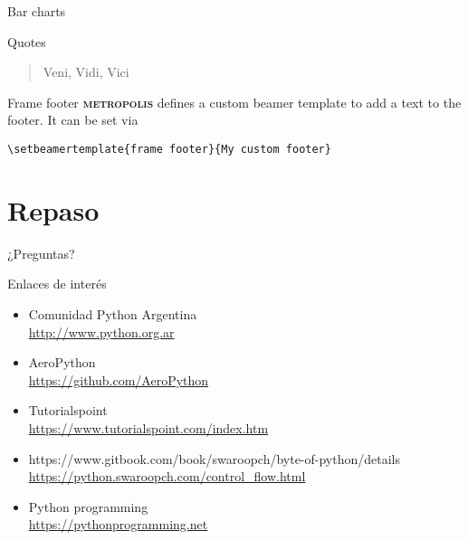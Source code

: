 \documentclass[10pt]{beamer}
\newcommand{\themename}{\textbf{\textsc{metropolis}}\xspace}
\begin{document}
\begin{frame}{Bar charts}
  \begin{figure}
  \end{figure}
\end{frame}
\begin{frame}{Quotes}
  \begin{quote}
    Veni, Vidi, Vici
  \end{quote}
\end{frame}

{%
\begin{frame}[fragile]{Frame footer}
    \themename defines a custom beamer template to add a text to the footer. It can be set via
    \begin{verbatim}\setbeamertemplate{frame footer}{My custom footer}\end{verbatim}
\end{frame}
}



\section{Repaso}

\begin{frame}[standout]
  ¿Preguntas?
\end{frame}

\appendix

\begin{frame}{Enlaces de interés}
	\begin{itemize}
		\item \alert{Comunidad Python Argentina}\\ \url{http://www.python.org.ar}
		\item \alert{AeroPython}\\ \url{https://github.com/AeroPython}
		\item \alert{Tutorialspoint}\\ \url{https://www.tutorialspoint.com/index.htm}
		\item \alert{https://www.gitbook.com/book/swaroopch/byte-of-python/details}\\ \url{https://python.swaroopch.com/control_flow.html}
		\item \alert{Python programming}\\ \url{https://pythonprogramming.net}
	\end{itemize}
\end{frame}
\end{document}
